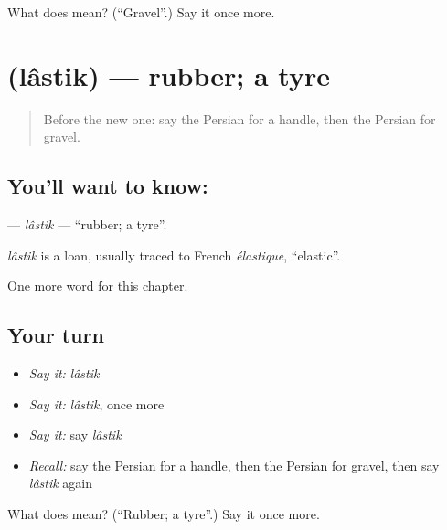 \begin{tcolorbox}[breakable,colback=teal!4,colframe=teal!35!black,title={Before you move on}]
What does  mean? (\textquotedblleft{}Gravel\textquotedblright{}.) Say it once more.
\end{tcolorbox}
\section[\texorpdfstring{\fa{لاستیک} (lâstik)}{لاستیک (lâstik)}]{ (lâstik) — rubber; a tyre}

\label{lesson:FA-C283-lastik}



\begin{quote}
Before the new one: say the Persian for a handle, then the Persian for gravel.
\end{quote}

\subsection*{You'll want to know: }
\textbf{} — \emph{lâstik} — \textquotedblleft{}rubber; a tyre\textquotedblright{}.

\begin{cousinweb}
\emph{lâstik} is a loan, usually traced to French \emph{élastique}, \textquotedblleft{}elastic\textquotedblright{}.
\end{cousinweb}

\begin{grammarlens}[title={What you've built}]
One more word for this chapter.
\end{grammarlens}

\subsection*{Your turn}
\begin{itemize}
\raggedright
  \item \emph{Say it:} \emph{lâstik}
  \item \emph{Say it:} \emph{lâstik}, once more
  \item \emph{Say it:} say \emph{lâstik}
  \item \emph{Recall:} say the Persian for a handle, then the Persian for gravel, then say \emph{lâstik} again
\end{itemize}

\begin{tcolorbox}[breakable,colback=teal!4,colframe=teal!35!black,title={Before you move on}]
What does  mean? (\textquotedblleft{}Rubber; a tyre\textquotedblright{}.) Say it once more.
\end{tcolorbox}
